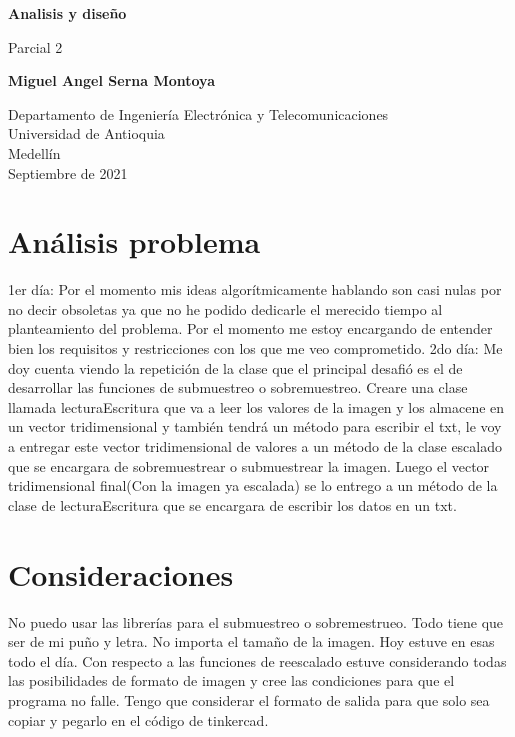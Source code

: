 \documentclass{article}
\begin{document}
\begin{titlepage}
    \begin{center}
        \vspace*{1cm}
            
        \Huge
        \textbf{Analisis y diseño}
            
        \vspace{0.5cm}
        \LARGE
        Parcial 2
            
        \vspace{1.5cm}
        \textbf{Miguel Angel Serna Montoya}
            
        \vfill
            
        \vspace{0.8cm}
            
        \Large
        Departamento de Ingeniería Electrónica y Telecomunicaciones\\
        Universidad de Antioquia\\
        Medellín\\
        Septiembre de 2021
            
    \end{center}
\end{titlepage}

\tableofcontents

\section{Análisis problema} \label{contenido}
1er día: Por el momento mis ideas algorítmicamente hablando son casi nulas por no decir obsoletas ya que no he podido dedicarle el merecido tiempo al planteamiento del problema. Por el momento me estoy encargando de entender bien los requisitos y restricciones con los que me veo comprometido.
2do día: Me doy cuenta viendo la repetición de la clase que el principal desafió es el de desarrollar las funciones de submuestreo o sobremuestreo. Creare una clase llamada lecturaEscritura que va a leer los valores de la imagen y los almacene en un vector tridimensional y también tendrá un método para escribir el txt, le voy a entregar este vector tridimensional de valores a un método de la clase escalado que se encargara de sobremuestrear o submuestrear la imagen. Luego el vector tridimensional final(Con la imagen ya escalada) se lo entrego a un método de  la clase de lecturaEscritura que se encargara de escribir los datos en un txt.
\section{Consideraciones}
No puedo usar las librerías para el submuestreo o sobremestrueo. Todo tiene que ser de mi puño y letra.
No importa el tamaño de la imagen. Hoy estuve en esas todo el día.
Con respecto a las funciones de reescalado estuve considerando todas las posibilidades de formato de imagen y cree las condiciones para que el programa no falle.
Tengo que considerar el formato de salida para que solo sea copiar y pegarlo en el código de tinkercad.
\newpage
\end{document}
